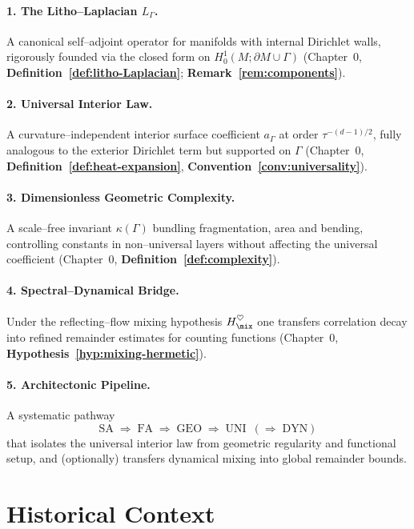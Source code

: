 \paragraph{1. The Litho–Laplacian $L_\Gamma$.}
A canonical self–adjoint operator for manifolds with internal Dirichlet walls, rigorously founded via the closed form on $H^1_0(M;\partial M\cup\Gamma)$ (Chapter~0, \textbf{Definition~\ref{def:litho-Laplacian}}; \textbf{Remark~\ref{rem:components}}).

\paragraph{2. Universal Interior Law.}
A curvature–independent interior surface coefficient $a_\Gamma$ at order $\tau^{-(d-1)/2}$, fully analogous to the exterior Dirichlet term but supported on $\Gamma$ (Chapter~0, \textbf{Definition~\ref{def:heat-expansion}}, \textbf{Convention~\ref{conv:universality}}).

\paragraph{3. Dimensionless Geometric Complexity.}
A scale–free invariant $\kappa(\Gamma)$ bundling fragmentation, area and bending, controlling constants in non–universal layers without affecting the universal coefficient (Chapter~0, \textbf{Definition~\ref{def:complexity}}).

\paragraph{4. Spectral–Dynamical Bridge.}
Under the reflecting–flow mixing hypothesis $H_{\mix}^{\heartsuit}$ one transfers correlation decay into refined remainder estimates for counting functions (Chapter~0, \textbf{Hypothesis~\ref{hyp:mixing-hermetic}}).

\paragraph{5. Architectonic Pipeline.}
A systematic pathway
\[
\mathrm{SA}\;\Longrightarrow\;\mathrm{FA}\;\Longrightarrow\;\mathrm{GEO}\;\Longrightarrow\;\mathrm{UNI}\;\ (\Longrightarrow\;\mathrm{DYN})
\]
that isolates the universal interior law from geometric regularity and functional setup, and (optionally) transfers dynamical mixing into global remainder bounds.

\medskip

\section{Historical Context}\label{sec:history}

